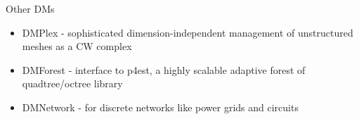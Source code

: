 
\begin{frame}{Other DMs}
  \begin{itemize}
  \item DMPlex - sophisticated dimension-independent management of unstructured meshes as a CW complex
  \item DMForest - interface to p4est, a highly scalable adaptive forest of quadtree/octree library
  \item DMNetwork - for discrete networks like power grids and circuits
  \end{itemize}
\end{frame}
